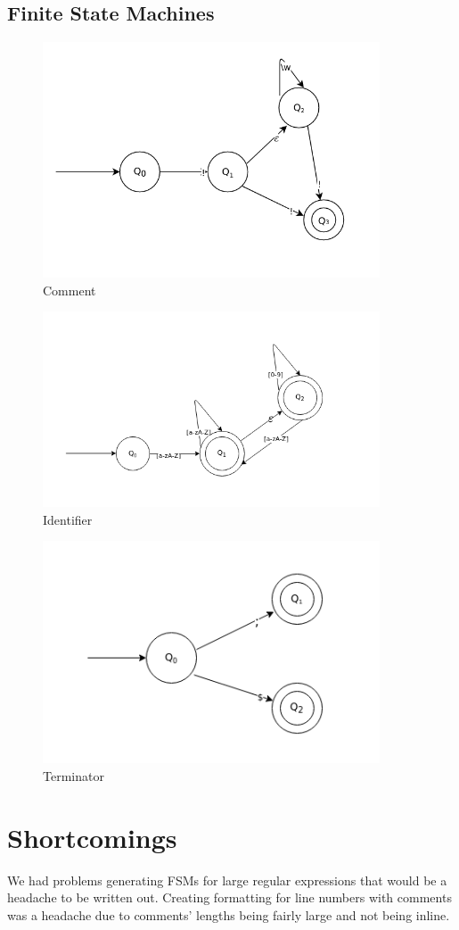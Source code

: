 \documentclass{article}
\begin{document}
    \subsection{Finite State Machines}
        \begin{figure}[!hbtp]
            \centering
            \includegraphics[width=10cm]{Comment-FSM.png}
            \caption{Comment}
        \end{figure}

       \begin{figure}[!hbtp]
            \centering
            \includegraphics[width=10cm]{Identifier.png}
            \caption{Identifier}
        \end{figure}

       \begin{figure}[!hbtp]
            \centering
            \includegraphics[width=10cm]{Terminators.png}
            \caption{Terminator}
        \end{figure}

\newpage

\section{Shortcomings}
    We had problems generating FSMs for large regular expressions that would be a headache to be written out. 
    Creating formatting for line numbers with comments was a headache due to comments' lengths being fairly large and not being inline.
\end{document}
